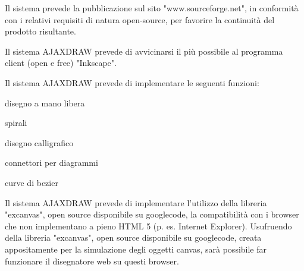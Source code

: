 \begin{elenconumerato}{\subsecindent}
\item Il sistema prevede la pubblicazione sul sito "www.sourceforge.net", in conformit\`a con i relativi requisiti di natura open-source, per favorire la continuit\`a del prodotto risultante.
\end{elenconumerato}

\begin{elenconumerato}{\subsecindent}
\item Il sistema AJAXDRAW prevede di avvicinarsi il pi\`u possibile al programma client (open e free) "Inkscape". 
\item Il sistema AJAXDRAW prevede di implementare le seguenti funzioni:

\begin{list}{-}{}
\item disegno a mano libera
\item spirali
\item disegno calligrafico
\item connettori per diagrammi
\item curve di bezier
\end{list}

\item Il sistema  AJAXDRAW prevede di implementare l'utilizzo della libreria "excanvas", open source disponibile su googlecode, la compatibilit\`a con i browser che non implementano a pieno HTML 5 (p. es. Internet Explorer).
         Usufruendo della libreria "excanvas", open source disponibile su googlecode, creata appositamente per la simulazione degli oggetti canvas, sar\`a possibile far funzionare il disegnatore web su questi browser. 
\end{elenconumerato}


